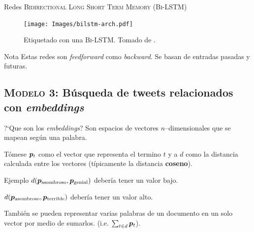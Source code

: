 \documentclass[10pt]{beamer}
\begin{document}
\begin{frame}{Redes \textsc{Bidirectional Long Short Term Memory (Bi-LSTM)}}
  \begin{figure}[H]
    \centering
    \texttt{[image: Images/bilstm-arch.pdf]}
    \caption[Etiquetado con una \textsc{Bi-LSTM}]{Etiquetado con una \textsc{Bi-LSTM}. Tomado de \cite{Huang2015}.}
    \label{fig:bilstm-arch}
  \end{figure}

  \begin{alertblock}{Nota}
    Estas redes son \emph{feedforward} como \emph{backward}. Se basan de entradas pasadas y futuras.
  \end{alertblock}
\end{frame}




\subsection{\textsc{Modelo 3:} Búsqueda de tweets relacionados con \emph{embeddings}}

\begin{frame}{?`Que son los \emph{embeddings}?}
  Son espacios de vectores $n$--dimensionales que se mapean según una palabra.

  Tómese ${\bm{p}}_{t}$ como el vector que representa el termino $t$ y a $d$ como la distancia calculada entre los vectores (típicamente la distancia \textbf{coseno}).

  \begin{alertblock}{Ejemplo}
    $d({\bm{p}}_{\text{asombroso}}, {\bm{p}}_{\text{genial}})$ debería tener un valor bajo.
    
    $d({\bm{p}}_{\text{asombroso}}, {\bm{p}}_{\text{terrible}})$ debería tener un valor alto.
  \end{alertblock}

  También se pueden representar varias palabras de un documento en un solo vector por medio de sumarlos. (i.e. $\sum_{t \in d}{\bm{p}}_{t}$).
\end{frame}
\end{document}
